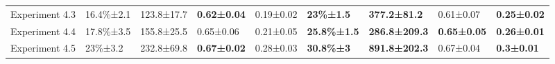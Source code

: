 \begin{table*}[]
{\begin{tabular}{|l|llll|llll|}
Experiment 4.3 & 16.4\%±2.1        & 123.8±17.7         & \textbf{0.62±0.04} & 0.19±0.02          & \textbf{23\%±1.5}          & \textbf{377.2±81.2}       & 0.61±0.07                 & \textbf{0.25±0.02}        \\
Experiment 4.4 & 17.8\%±3.5        & 155.8±25.5         & 0.65±0.06          & 0.21±0.05          & \textbf{25.8\%±1.5}        & \textbf{286.8±209.3}      & \textbf{0.65±0.05}        & \textbf{0.26±0.01}        \\
Experiment 4.5 & 23\%±3.2          & 232.8±69.8         & \textbf{0.67±0.02} & 0.28±0.03          & \textbf{30.8\%±3}          & \textbf{891.8±202.3}      & 0.67±0.04                 & \textbf{0.3±0.01}         \\ \hline
\end{tabular}%
}
\end{table*}